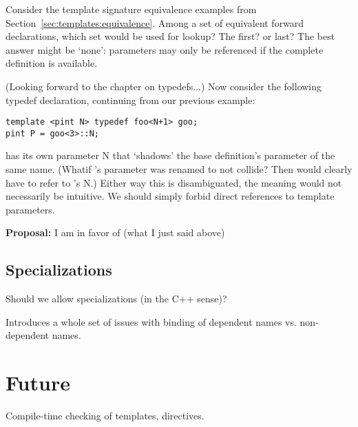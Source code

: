 Consider the template signature equivalence examples from
Section~\ref{sec:templates:equivalence}.  
Among a set of equivalent forward declarations, which set
would be used for lookup?  The first? or last?  
The best answer might be `none': parameters may only be referenced
if the complete definition is available.  

(Looking forward to the chapter on typedefs...)
Now consider the following typedef declaration, continuing from
our previous example:

\begin{verbatim}
template <pint N> typedef foo<N+1> goo;
pint P = goo<3>::N;
\end{verbatim}

 has its own parameter N that `shadows' the base definition's
parameter of the same name.  
(Whatif 's parameter was renamed to not collide?
Then  would clearly have to refer to 's N.)  
Either way this is disambiguated, the meaning would not necessarily be 
intuitive.  
We should simply forbid direct references to template parameters.  

\textbf{Proposal:} I am in favor of (what I just said above)

\subsection{Specializations}
\label{sec:templates:issues:specialization}

Should we allow specializations (in the C++ sense)?

Introduces a whole set of issues with binding of dependent names
vs. non-dependent names.  

\section{Future}
\label{sec:templates:future}

Compile-time checking of templates, directives.  

